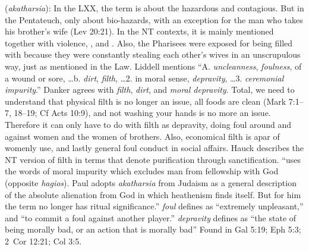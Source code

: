 \item[Depravity,]

(\textit{akatharsia}):
In the LXX, the term is about the hazardous and contagious. But in the Pentateuch, only about bio-hazards, with an exception for the man who takes his brother's wife (Lev 20:21). In the NT contexts, it is mainly mentioned together with  violence, , and . Also, the Pharisees were exposed for being filled with  because they were constantly stealing each other's wives in an unscrupulous way, just as mentioned in the Law. Liddell mentions ``A. \emph{uncleanness}, \emph{foulness}, of a wound or sore, \ldots b. \emph{dirt}, \emph{filth}, \ldots 2. in moral sense, \emph{depravity}, \ldots 3. \emph{ceremonial impurity}.'' Danker agrees with \emph{filth}, \emph{dirt}, and \emph{moral depravity}. Total, we need to understand that physical filth is no longer an issue, all foods are clean (Mark 7:1--7, 18--19; Cf Acts 10:9), and not washing your hands is no more an issue. Therefore it can only have to do with filth as depravity, doing foul around and against women and the women of brothers. Also, economical filth is apar of womenly use, and lastly general foul conduct in social affairs.
Hauck describes the NT version of filth in terms that denote purification through sanctification. ``uses the words of moral impurity which excludes man from fellowship with God (opposite \emph{hagios}). Paul adopts \emph{akatharsia} from Judaism as a general description of the absolute alienation from God in which heathenism finds itself. But for him the term no longer has ritual significance.'' \emph{foul} defines as ``extremely unpleasant,'' and ``to commit a foul against another player.'' \emph{depravity} defines as ``the state of being morally bad, or an action that is morally bad''
Found in Gal 5:19; Eph 5:3; 2~Cor 12:21; Col 3:5.
